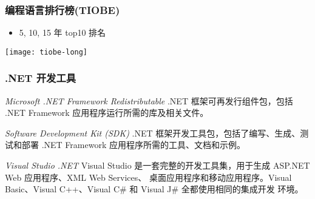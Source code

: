 \begin{frame}
\frametitle{编程语言排行榜(TIOBE)}
\begin{itemize}
\item 5, 10, 15 年 top10 排名
\end{itemize}

\centering \texttt{[image: tiobe-long]}

\end{frame}

\begin{frame}
\frametitle{.NET 开发工具}

\begin{exampleblock}{\textit{Microsoft .NET Framework Redistributable}}
  \CJKindent .NET 框架可再发行组件包，包括 .NET Framework 应用程序运行所需的库及相关文件。
\end{exampleblock}
\pause
\begin{exampleblock}{\textit{Software Development Kit (SDK)}}
  \CJKindent .NET 框架开发工具包，包括了编写、生成、测试和部署 .NET Framework 应用程序所需的工具、文档和示例。
\end{exampleblock}
\pause
\begin{block}{\textit{Visual Studio .NET}}
  \CJKindent Visual Studio 是一套完整的开发工具集，用于生成 ASP.NET Web 应用程序、XML Web Services、
  桌面应用程序和移动应用程序。Visual Basic、Visual C++、Visual C\# 和 Visual J\# 全都使用相同的集成开发
  环境。
\end{block}

\end{frame}

